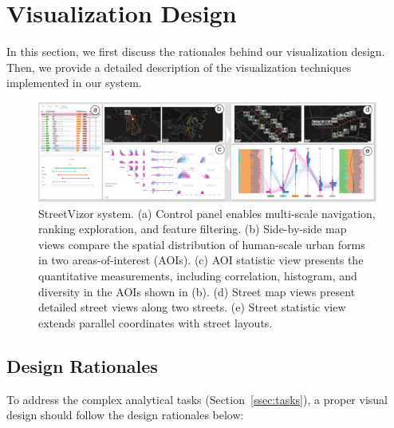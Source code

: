 \section{Visualization Design}

In this section, we first discuss the rationales behind our visualization design. 
Then, we provide a detailed description of the visualization techniques implemented in our system.


\begin{figure}[t] 
	\centering
	\includegraphics[width=0.9\columnwidth]{figure/streetvizor/fig1_teaser/teaser}
	\vspace{-3mm}
	\caption{StreetVizor system. 
		(a) Control panel enables multi-scale navigation, ranking exploration, and feature filtering.
		(b) Side-by-side map views compare the spatial distribution of human-scale urban forms in two areas-of-interest (AOIs).
		(c) AOI statistic view presents the quantitative measurements, including correlation, histogram, and diversity in the AOIs shown in (b).
		(d) Street map views present detailed street views along two streets.
		(e) Street statistic view extends parallel coordinates with street layouts.}
	\label{fig:teaser}
	\vspace{-5mm}
\end{figure}



\subsection{Design Rationales}
To address the complex analytical tasks (Section~\ref{ssec:tasks}), a proper visual design should follow the design rationales below:

